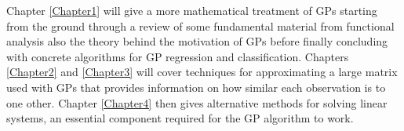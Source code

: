 Chapter \ref{Chapter1} will give a more mathematical treatment of GPs starting from the ground through a review of some fundamental material from functional analysis also the theory behind the motivation of GPs before finally concluding with concrete algorithms for GP regression and classification. Chapters \ref{Chapter2} and \ref{Chapter3} will cover techniques for approximating a large matrix used with GPs that provides information on how similar each observation is to one other. Chapter \ref{Chapter4} then gives alternative methods for solving linear systems, an essential component required for the GP algorithm to work.

\newpage
{}
